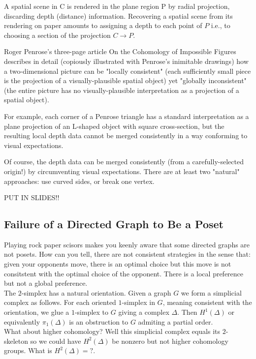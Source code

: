 \documentclass[12pt]{article}
\begin{document}
A spatial scene in C is rendered in the plane region P by radial projection, discarding depth (distance) information. Recovering a spatial scene from its rendering on paper amounts to assigning a depth to each point of $P$ i.e., to choosing a section of the projection $C \to P$.

Roger Penrose's three-page article On the Cohomology of Impossible Figures describes in detail (copiously illustrated with Penrose's inimitable drawings) how a two-dimensional picture can be "locally consistent" (each sufficiently small piece is the projection of a visually-plausible spatial object) yet "globally inconsistent" (the entire picture has no visually-plausible interpretation as a projection of a spatial object).

For example, each corner of a Penrose triangle has a standard interpretation as a plane projection of an L-shaped object with square cross-section, but the resulting local depth data cannot be merged consistently in a way conforming to visual expectations.

Of course, the depth data can be merged consistently (from a carefully-selected origin!) by circumventing visual expectations. There are at least two "natural" approaches: use curved sides, or break one vertex.



PUT IN SLIDES!!

\subsection{Failure of a Directed Graph to Be a Poset}

Playing rock paper scisors makes you keenly aware that some directed graphs are not posets. How can you tell, there are not consistent strategies in the sense that: given your opponents move, there is an optimal choice but this move is not consitstent with the optimal choice of the opponent. There is a local preference but not a global preference.  
\bigskip\\
The $2$-simplex has a natural orientation. Given a graph $G$ we form a simplicial complex as follows. For each oriented $1$-simplex in $G$, meaning consistent with the orientation, we glue a $1$-simplex to $G$ giving a complex $\Delta$. Then $H^1(\Delta)$ or equivalently $\pi_1(\Delta)$ is an obstruction to $G$ admiting a partial order.
\bigskip\\
What about higher cohomology? Well this simplicial complex equals its $2$-skeleton so we could have $H^2(\Delta)$ be nonzero but not higher cohomology groups. What is $H^2(\Delta) = ?$.
\end{document}

